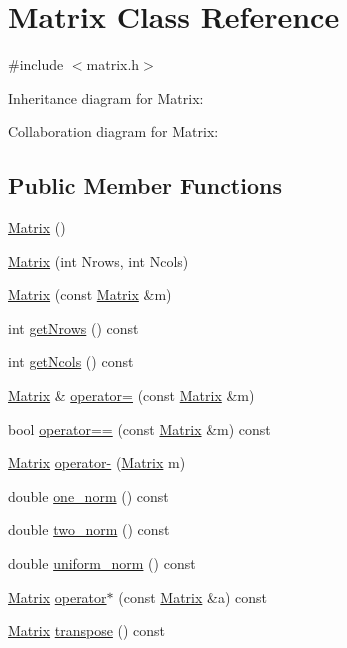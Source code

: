\hypertarget{class_matrix}{}\section{Matrix Class Reference}
\label{class_matrix}


{\ttfamily \#include $<$matrix.\+h$>$}



Inheritance diagram for Matrix\+:


Collaboration diagram for Matrix\+:
\subsection*{Public Member Functions}
\begin{DoxyCompactItemize}
\item 
\mbox{\hyperlink{class_matrix_a2dba13c45127354c9f75ef576f49269b}{Matrix}} ()
\item 
\mbox{\hyperlink{class_matrix_a135a15de1126d735bb95fcc839d739d7}{Matrix}} (int Nrows, int Ncols)
\item 
\mbox{\hyperlink{class_matrix_a765f4dcb51b6829311cc3e7576388423}{Matrix}} (const \mbox{\hyperlink{class_matrix}{Matrix}} \&m)
\item 
int \mbox{\hyperlink{class_matrix_a711f84a1c62832d9d197d78c9855a276}{get\+Nrows}} () const
\item 
int \mbox{\hyperlink{class_matrix_ae0a5f2154953b8d129a90b04f91d9079}{get\+Ncols}} () const
\item 
\mbox{\hyperlink{class_matrix}{Matrix}} \& \mbox{\hyperlink{class_matrix_aea5a06385f646eb4a63929fae6fa3e14}{operator=}} (const \mbox{\hyperlink{class_matrix}{Matrix}} \&m)
\item 
bool \mbox{\hyperlink{class_matrix_a35097c20bcb1495b57d452db0d7b1f53}{operator==}} (const \mbox{\hyperlink{class_matrix}{Matrix}} \&m) const
\item 
\mbox{\hyperlink{class_matrix}{Matrix}} \mbox{\hyperlink{class_matrix_a2aabf841a4302d528f8b102c0800a263}{operator-\/}} (\mbox{\hyperlink{class_matrix}{Matrix}} m)
\item 
double \mbox{\hyperlink{class_matrix_af4d468252f3ecbbcaa5726c76e332b4c}{one\+\_\+norm}} () const
\item 
double \mbox{\hyperlink{class_matrix_aac496af05ec7aa26afc2b9c6d0ab8b66}{two\+\_\+norm}} () const
\item 
double \mbox{\hyperlink{class_matrix_a43066c7fe6418aad40170b85415063e8}{uniform\+\_\+norm}} () const
\item 
\mbox{\hyperlink{class_matrix}{Matrix}} \mbox{\hyperlink{class_matrix_aaa40c78e6b3bb5bbf572d35612dbf6a7}{operator$\ast$}} (const \mbox{\hyperlink{class_matrix}{Matrix}} \&a) const
\item 
\mbox{\hyperlink{class_matrix}{Matrix}} \mbox{\hyperlink{class_matrix_a759661b75b9681f3a89ff75e27933b3a}{transpose}} () const
\end{DoxyCompactItemize}
